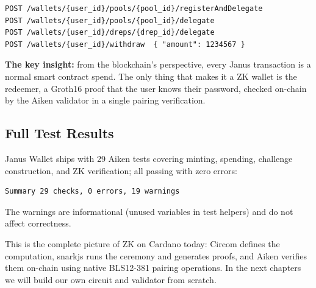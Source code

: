 \begin{verbatim}
POST /wallets/{user_id}/pools/{pool_id}/registerAndDelegate
POST /wallets/{user_id}/pools/{pool_id}/delegate
POST /wallets/{user_id}/dreps/{drep_id}/delegate
POST /wallets/{user_id}/withdraw  { "amount": 1234567 }
\end{verbatim}

\begin{highlight}
\textbf{The key insight:} from the blockchain's perspective, every Janus transaction is a normal smart contract spend. The only thing that makes it a ZK wallet is the redeemer, a Groth16 proof that the user knows their password, checked on-chain by the Aiken validator in a single pairing verification.
\end{highlight}

\subsection*{Full Test Results}

Janus Wallet ships with 29 Aiken tests covering minting, spending, challenge construction, and ZK verification; all passing with zero errors:

\begin{verbatim}
Summary 29 checks, 0 errors, 19 warnings
\end{verbatim}

The warnings are informational (unused variables in test helpers) and do not affect correctness.

This is the complete picture of ZK on Cardano today: Circom defines the computation, snarkjs runs the ceremony and generates proofs, and Aiken verifies them on-chain using native BLS12-381 pairing operations. In the next chapters we will build our own circuit and validator from scratch.
